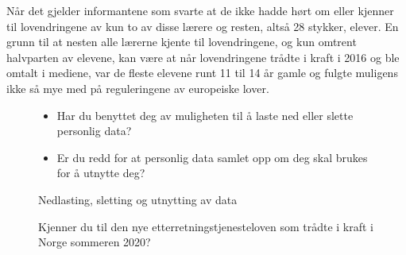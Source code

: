 Når det gjelder informantene som svarte at de ikke hadde hørt om eller kjenner til lovendringene av kun to av disse lærere og resten, altså 28 stykker, elever. En grunn til at nesten alle lærerne kjente til lovendringene, og kun omtrent halvparten av elevene, kan være at når lovendringene trådte i kraft i 2016 og ble omtalt i mediene, var de fleste elevene runt 11 til 14 år gamle og fulgte muligens ikke så mye med på reguleringene av europeiske lover. 

\begin{figure}[H]
    \centering
    \begin{itemize}
        \item Har du benyttet deg av muligheten til å laste ned eller slette personlig data?
        \item Er du redd for at personlig data samlet opp om deg skal brukes for å utnytte deg?
    \end{itemize}
    \caption{Nedlasting, sletting og utnytting av data}
\end{figure}

\begin{figure}[H]
    \centering
    \caption{Kjenner du til den nye etterretningstjenesteloven som trådte i kraft i Norge sommeren 2020?}
\end{figure}

